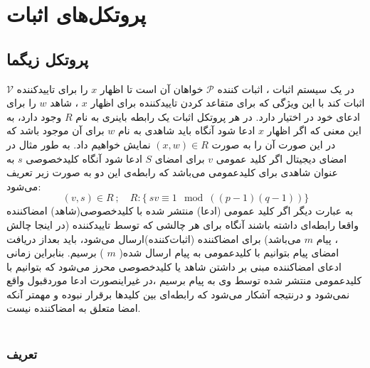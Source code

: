 \section{ پروتکل‌های اثبات }\label{proof_protocol}
\subsection{ پروتکل زیگما}\label{sigma_protocol}

در یک سیستم اثبات ، اثبات کننده 
$\mathcal{P}$
خواهان آن است تا اظهار 
$x$
را برای تاییدکننده 
$\mathcal{V}$
اثبات کند با این ویژگی که برای متقاعد کردن تاییدکننده برای اظهار
$x$
، شاهد 
$w$
را برای ادعای خود در اختیار دارد. در هر پروتکل اثبات یک رابطه باینری به نام 
$R$
وجود دارد، به این معنی که اگر اظهار
$x$
ادعا ‌شود آنگاه باید شاهدی
به نام 
$w$
برای آن موجود باشد که در این صورت آن را به صورت 
$(x,w) \in R $
نمایش خواهیم داد. به طور مثال در امضای دیجیتال اگر کلید عمومی 
$v$
برای امضای
$S$
ادعا شود آنگاه کلیدخصوصی
$s$
به عنوان شاهدی برای کلیدعمومی می‌باشد که رابطه‌ی این دو به صورت زیر تعریف می‌شود:
$$(v,s) \in R ~ ; \quad R :\{ ~ ‌sv \equiv 1  \mod ( (p-1)(q-1) )  \} $$
به عبارت دیگر اگر کلید عمومی (ادعا) منتشر شده با کلیدخصوصی(شاهد)  امضاکننده واقعا رابطه‌ای داشته باشند آنگاه برای هر چالشی که توسط تاییدکننده (در اینجا چالش ، پیام 
$m$
می‌باشد) برای امضاکننده (اثبات‌کننده)ارسال می‌شود، باید بعداز دریافت امضای پیام بتوانیم با کلیدعمومی به پیام ارسال شده(
$m$
) برسیم.
بنابراین زمانی ادعای امضاکننده مبنی بر داشتن شاهد یا کلیدخصوصی محرز می‌شود که بتوانیم با کلیدعمومی منتشر شده توسط وی به پیام برسیم ،در غیراینصورت ادعا موردقبول واقع نمی‌شود و درنتیجه آشکار می‌شود که رابطه‌ای بین کلیدها برقرار نبوده و مهمتر آنکه امضا متعلق به امضاکننده نیست.
\\
\\
\subsubsection{ تعریف }\label{sigma_protocol_definition}

